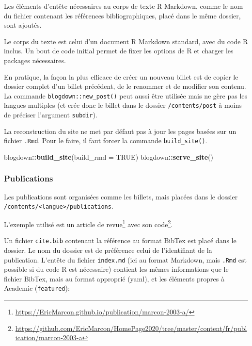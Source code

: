 \documentclass[
  12pt,
  french,
  a4paper,
  extrafontsizes,onecolumn,openright
  ]{memoir}
\newenvironment{Shaded}{\begin{snugshade}}{\end{snugshade}}
\newcommand{\DataTypeTok}[1]{\textcolor[rgb]{0.13,0.29,0.53}{#1}}
\newcommand{\KeywordTok}[1]{\textcolor[rgb]{0.13,0.29,0.53}{\textbf{#1}}}
\newcommand{\NormalTok}[1]{#1}
\newcommand{\OperatorTok}[1]{\textcolor[rgb]{0.81,0.36,0.00}{\textbf{#1}}}
\newcommand{\OtherTok}[1]{\textcolor[rgb]{0.56,0.35,0.01}{#1}}
\begin{document}
Les éléments d'entête nécessaires au corps de texte R Markdown, comme le nom du fichier contenant les références bibliographiques, placé dans le même dossier, sont ajoutés.

Le corps du texte est celui d'un document R Markdown standard, avec du code R inclus.
Un bout de code initial permet de fixer les options de R et charger les packages nécessaires.

En pratique, la façon la plus efficace de créer un nouveau billet est de copier le dossier complet d'un billet précédent, de le renommer et de modifier son contenu.
La commande \texttt{blogdown::new\_post()} peut aussi être utilisée mais ne gère pas les langues multiples (et crée donc le billet dans le dossier \texttt{/contents/post} à moins de préciser l'argument \texttt{subdir}).

La reconstruction du site ne met par défaut pas à jour les pages basées sur un fichier \texttt{.Rmd}.
Pour le faire, il faut forcer la commande \texttt{build\_site()}.

\scriptsize

\begin{Shaded}
\begin{Highlighting}[]
\NormalTok{blogdown}\OperatorTok{::}\KeywordTok{build_site}\NormalTok{(}\DataTypeTok{build_rmd =} \OtherTok{TRUE}\NormalTok{)}
\NormalTok{blogdown}\OperatorTok{::}\KeywordTok{serve_site}\NormalTok{()}
\end{Highlighting}
\end{Shaded}

\normalsize

\hypertarget{publications}{%
\subsubsection{Publications}\label{publications}}

Les publications sont organisées comme les billets, mais placées dans le dossier \texttt{/contents/\textless{}langue\textgreater{}/publications}.

L'exemple utilisé est un article de revue\footnote{\url{https://EricMarcon.github.io/publication/marcon-2003-a/}} avec son code\footnote{\url{https://github.com/EricMarcon/HomePage2020/tree/master/content/fr/publication/marcon-2003-a}}.

Un fichier \texttt{cite.bib} contenant la référence au format BibTex est placé dans le dossier.
Le nom du dossier est de préférence celui de l'identifiant de la publication.
L'entête du fichier \texttt{index.md} (ici au format Markdown, mais \texttt{.Rmd} est possible si du code R est nécessaire) contient les mêmes informations que le fichier BibTex, mais au format approprié (yaml), et les éléments propres à Academic (\texttt{featured}):
\end{document}
